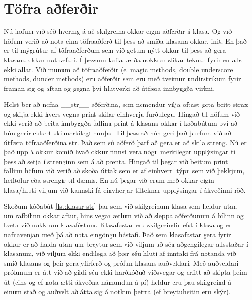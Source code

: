 \section{Töfra aðferðir}\label{uk:klasar-töfra-aðferðir}
Nú höfum við séð hvernig á að skilgreina okkar eigin aðferðir á klasa.
Og við höfum verið að nota eina töfraaðferð til þess að smíða klasana okkar, init.
En það er til mýgrútur af töfraaðferðum sem við getum nýtt okkur til þess að gera klasana okkar nothæfari.
Í þessum kafla verða nokkrar slíkar teknar fyrir en alls ekki allar.
Við munum að töfraaðferðir (e. magic methods, double underscore methods, dunder methods) eru aðferðir sem eru með tveimur undirstrikum fyrir framan sig og aftan og gegna því hlutverki að útfæra innbyggða virkni.

Helst ber að nefna \_\_str\_\_ aðferðina, sem nemendur vilja oftast geta beitt strax og skilja ekki hvers vegna print skilar einhverju furðulegu.
Hingað til höfum við ekki verið að beita innbyggða fallinu print á klasana okkar í kóðabútum því að hún gerir ekkert skilmerkilegt ennþá.
Til þess að hún geri það þurfum við að útfæra töfraaðferðina str.
Það sem sú aðferð þarf að gera er að skila streng.
Nú er það upp á okkur komið hvað okkur finnst vera nógu merkilegar upplýsingar til þess að setja í strenginn sem á að prenta.
Hingað til þegar við beitum print fallinu höfum við verið að skoða úttak sem er af einhverri týpu sem við þekkjum, heiltölur eða strengir til dæmis.
En nú þegar við erum með okkar eigin klasa/hluti viljum við kannski fá einvherjar tilteknar upplýsingar í ákveðinni röð.

Skoðum kóðabút \ref{lst:klasar-str} þar sem við skilgreinum klasa sem heldur utan um rafbílinn okkar aftur, hins vegar ætlum við að sleppa aðferðunum á bílinn og bæta við nokkrum klasaföstum.
Klasafastar eru skilgreindir efst í klasa og er nafnavenjan með þá að nota eingöngu hástafi.
Það sem klasafastar gera fyrir okkur er að halda utan um breytur sem við viljum að séu aðgengilegar allsstaðar í klasanum, við viljum ekki endilega að þær séu hluti af inntaki frá notanda við smíð klasans og þeir gera yfirferð og prófun klasans auðveldari.
Með auðveldari prófunum er átt við að gildi séu ekki harðkóðuð víðsvegar og erfitt að skipta þeim út (eins og ef nota ætti ákveðna námundun á pí) heldur eru þau skilgreind á einum stað og auðvelt að átta sig á notkun þeirra (ef breytuheitin eru skýr).

